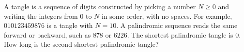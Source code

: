 A tangle is a sequence of digits constructed by picking a number $N\ge  0$ and writing the integers from $0$ to $N$ in some order, with no spaces. For example, $010123459876$ is a tangle with $N = 10$. A palindromic sequence reads the same forward or backward, such as $878$ or $6226$. The shortest palindromic tangle is $0$. How long is the second-shortest palindromic tangle?
